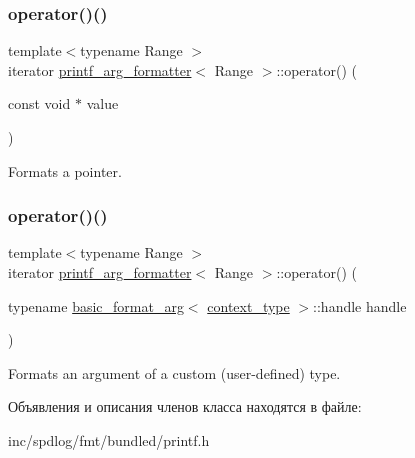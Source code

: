 \subsubsection{\texorpdfstring{operator()()}{operator()()}\hspace{0.1cm}{\footnotesize\ttfamily [3/4]}}
{\footnotesize\ttfamily template$<$typename Range $>$ \\
iterator \hyperlink{classprintf__arg__formatter}{printf\+\_\+arg\+\_\+formatter}$<$ Range $>$\+::operator() (\begin{DoxyParamCaption}\item[{const void $\ast$}]{value }\end{DoxyParamCaption})\hspace{0.3cm}{\ttfamily [inline]}}

Formats a pointer. \mbox{\label{classprintf__arg__formatter_a57ded50a248eab9775966e05330dfcb5}} 
\subsubsection{\texorpdfstring{operator()()}{operator()()}\hspace{0.1cm}{\footnotesize\ttfamily [4/4]}}
{\footnotesize\ttfamily template$<$typename Range $>$ \\
iterator \hyperlink{classprintf__arg__formatter}{printf\+\_\+arg\+\_\+formatter}$<$ Range $>$\+::operator() (\begin{DoxyParamCaption}\item[{typename \hyperlink{classbasic__format__arg}{basic\+\_\+format\+\_\+arg}$<$ \hyperlink{classbasic__printf__context}{context\+\_\+type} $>$\+::handle}]{handle }\end{DoxyParamCaption})\hspace{0.3cm}{\ttfamily [inline]}}

Formats an argument of a custom (user-\/defined) type. 

Объявления и описания членов класса находятся в файле\+:\begin{DoxyCompactItemize}
\item 
inc/spdlog/fmt/bundled/printf.\+h\end{DoxyCompactItemize}
